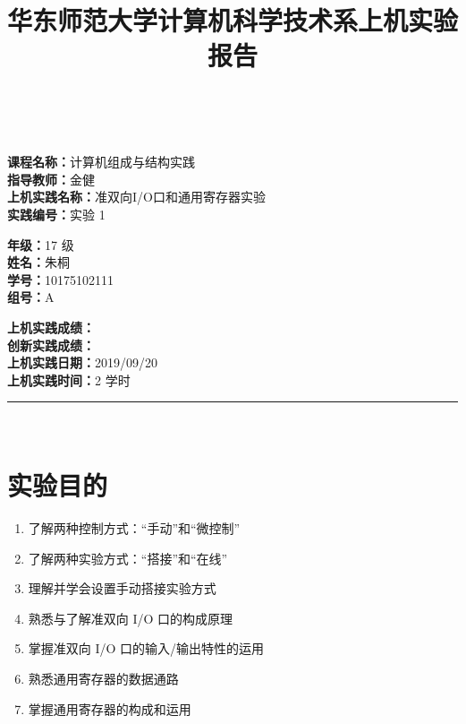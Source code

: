 \documentclass[a4paper,10pt,UTF8]{paper}
\title{华东师范大学计算机科学技术系上机实验报告}
\numberwithin{equation}{section}
\numberwithin{figure}{section}
\begin{document}
\pagestyle{fancy}
\lhead{}
\rhead{}
\makeatletter
\def\headrule{{\if@fancyplain\let\headrulewidth\plainheadrulewidth\fi%
\color{gray}\hrule\@height 0.2pt\@width\headwidth}
  \vspace{6mm}}
\makeatother

\newcommand{\HRule}{\rule{\linewidth}{1mm}}
\newcommand{\dai}{\textbf{Dais-CMX16$^+$}}

{ \\ [0.8cm]

\small{
  \begin{minipage}[t]{.32\linewidth}
    \textbf{课程名称：}计算机组成与结构实践\\
    \textbf{指导教师：}金健\\
    \textbf{上机实践名称：}准双向I/O口和通用寄存器实验\\
    \textbf{实践编号：}实验 1
  \end{minipage}
  \begin{minipage}[t]{.32\linewidth}
    \textbf{年级：}17 级\\
    \textbf{姓名：}朱桐\\
    \textbf{学号：}10175102111\\
    \textbf{组号：}A
  \end{minipage} 
  \begin{minipage}[t]{.32\linewidth}
    \textbf{上机实践成绩：} \\
    \textbf{创新实践成绩：} \\
    \textbf{上机实践日期：}2019/09/20\\
    \textbf{上机实践时间：}2 学时\\
  \end{minipage}
}
\HRule \\[0.5cm]
}
\section{实验目的}

\begin{enumerate}
    \item 了解两种控制方式：“手动”和“微控制”
    \item 了解两种实验方式：“搭接”和“在线”
    \item 理解并学会设置手动搭接实验方式
    \item 熟悉与了解准双向 I/O 口的构成原理
    \item 掌握准双向 I/O 口的输入/输出特性的运用
    \item 熟悉通用寄存器的数据通路
    \item 掌握通用寄存器的构成和运用
\end{enumerate}
\end{document}
